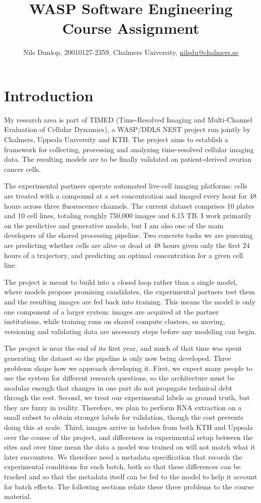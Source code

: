 \documentclass{article}
\title{WASP Software Engineering Course Assignment}
\author{Nils Dunlop, 20010127-2359, Chalmers University, \href{mailto:nilsdu@chalmers.se }{nilsdu@chalmers.se}\\}
\begin{document}
\maketitle

\section{Introduction}

My research area is part of TIMED (Time-Resolved Imaging and Multi-Channel Evaluation of Cellular Dynamics), a WASP/DDLS NEST project run jointly by Chalmers, Uppsala University and KTH. The project aims to establish a framework for collecting, processing and analyzing time-resolved cellular imaging data. The resulting models are to be finally validated on patient-derived ovarian cancer cells.

The experimental partners operate automated live-cell imaging platforms: cells are treated with a compound at a set concentration and imaged every hour for 48 hours across three fluorescence channels. The current dataset comprises 10 plates and 10 cell lines, totaling roughly 750,000 images and 6.15 TB. I work primarily on the predictive and generative models, but I am also one of the main developers of the shared processing pipeline. Two concrete tasks we are pursuing are predicting whether cells are alive or dead at 48 hours given only the first 24 hours of a trajectory, and predicting an optimal concentration for a given cell line.

The project is meant to build into a closed loop rather than a single model, where models propose promising candidates, the experimental partners test them and the resulting images are fed back into training. This means the model is only one component of a larger system: images are acquired at the partner institutions, while training runs on shared compute clusters, so moving, versioning and validating data are necessary steps before any modeling can begin.

The project is near the end of its first year, and much of that time was spent generating the dataset so the pipeline is only now being developed. Three problems shape how we approach developing it. First, we expect many people to use the system for different research questions, so the architecture must be modular enough that changes in one part do not propagate technical debt through the rest. Second, we treat our experimental labels as ground truth, but they are fuzzy in reality. Therefore, we plan to perform RNA extraction on a small subset to obtain stronger labels for validation, though the cost prevents doing this at scale. Third, images arrive in batches from both KTH and Uppsala over the course of the project, and differences in experimental setup between the sites and over time mean the data a model was trained on will not match what it later encounters. We therefore need a metadata specification that records the experimental conditions for each batch, both so that these differences can be tracked and so that the metadata itself can be fed to the model to help it account for batch effects. The following sections relate these three problems to the course material.
\end{document}
